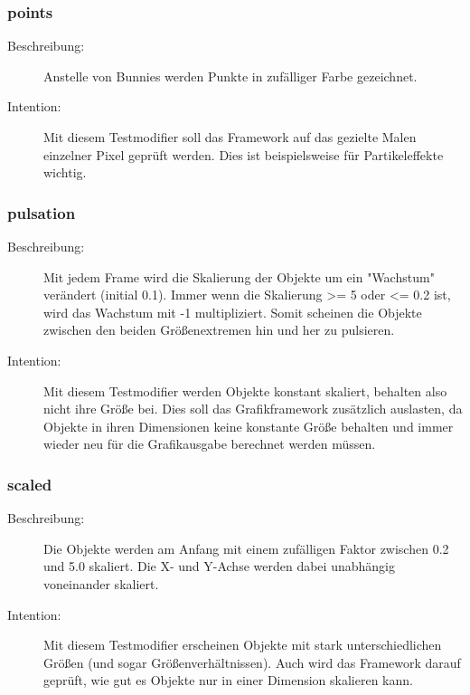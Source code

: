\subsubsection{points}
\begin{description}
\item[Beschreibung:] Anstelle von Bunnies werden Punkte in zufälliger Farbe gezeichnet. \\
\item[Intention:] Mit diesem Testmodifier soll das Framework auf das gezielte Malen einzelner Pixel geprüft werden. Dies ist beispielsweise für Partikeleffekte wichtig.
\end{description}

\subsubsection{pulsation}
\begin{description}
\item[Beschreibung:] Mit jedem Frame wird die Skalierung der Objekte um ein "Wachstum" verändert (initial 0.1). Immer wenn die Skalierung \textgreater= 5 oder \textless= 0.2 ist, wird das Wachstum mit -1 multipliziert. Somit scheinen die Objekte zwischen den beiden Größenextremen hin und her zu pulsieren. \\
\item[Intention:] Mit diesem Testmodifier werden Objekte konstant skaliert, behalten also nicht ihre Größe bei. Dies soll das Grafikframework zusätzlich auslasten, da Objekte in ihren Dimensionen keine konstante Größe behalten und immer wieder neu für die Grafikausgabe berechnet werden müssen.
\end{description}

\subsubsection{scaled}
\begin{description}
\item[Beschreibung:] Die Objekte werden am Anfang mit einem zufälligen Faktor zwischen 0.2 und 5.0 skaliert. Die X- und Y-Achse werden dabei unabhängig voneinander skaliert. \\
\item[Intention:] Mit diesem Testmodifier erscheinen Objekte mit stark unterschiedlichen Größen (und sogar Größenverhältnissen). Auch wird das Framework darauf geprüft, wie gut es Objekte nur in einer Dimension skalieren kann.
\end{description}

